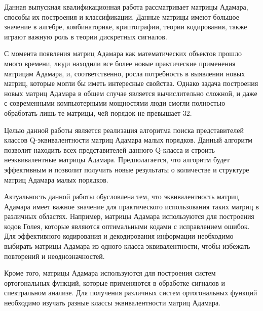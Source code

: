 \Introduction

Данная выпускная квалификационная работа рассматривает матрицы Адамара, способы их построения и классификации. Данные матрицы имеют большое значение в алгебре, комбинаторике, криптографии, теории кодирования, также играют важную роль в теории дискретных сигналов. 

С момента появления матриц Адамара как математических объектов прошло много времени, люди находили все более новые практические применения матрицам Адамара, и, соответственно, росла потребность в выявлении новых матриц, которые могли бы иметь интересные свойства. Однако задача построения новых матриц Адамара в общем случае является вычислительно сложной, и даже с современными компьютерными мощностями люди смогли полностью обработать лишь те матрицы, чей порядок не превышает 32.

Целью данной работы является реализация алгоритма поиска представителей классов Q-эквивалентности матриц Адамара малых порядков. Данный алгоритм позволит находить всех представителей данного Q-класса и строить неэквивалентные матрицы Адамара. Предполагается, что алгоритм будет эффективным и позволит получить новые результаты о количестве и структуре матриц Адамара малых порядков.

Актуальность данной работы обусловлена тем, что эквивалентность матриц Адамара имеет важное значение для практического использования таких матриц в различных областях. Например, матрицы Адамара используются для построения кодов Голея, которые являются оптимальными кодами с исправлением ошибок. Для эффективного кодирования и декодирования информации необходимо выбирать матрицы Адамара из одного класса эквивалентности, чтобы избежать повторений и неоднозначностей.

Кроме того, матрицы Адамара используются для построения систем ортогональных функций, которые применяются в обработке сигналов и спектральном анализе. Для получения различных систем ортогональных функций необходимо изучать разные классы эквивалентности матриц Адамара.

